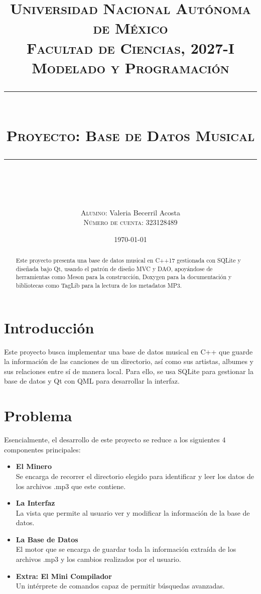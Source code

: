 \documentclass[12pt]{article}  %
\title{
    \textsc{\Large Universidad Nacional Autónoma de México\\[0.2cm]
        {\normalsize Facultad de Ciencias, 2027-I}\\[0.2cm]
        {\normalsize Modelado y Programación}}\\[0.6cm]
    \rule{\linewidth}{0.4pt}\\[0.4cm]
    {\textsc{\Large {\color{maincolor}Proyecto:} Base de Datos Musical}}\\[0.1cm]
    \rule{\linewidth}{0.4pt}\\[1em]
}
\author{
    \textsc{Alumno:} Valeria Becerril Acosta\\[0.2cm]
    \textsc{Número de cuenta:} 323128489\\[0.4cm]
}
\date{\today\\[2.6cm]}
\begin{document}
\maketitle
\thispagestyle{empty}

\begin{abstract}
    Este proyecto presenta una base de datos musical en C++17 gestionada con
    SQLite y diseñada bajo Qt, usando el patrón de diseño MVC y DAO, apoyándose de
    herramientas como Meson para la construcción, Doxygen para la documentación y
    bibliotecas como TagLib para la lectura de los metadatos MP3.
\end{abstract}

\newpage
\tableofcontents

\newpage
\section{Introducción}

Este proyecto busca implementar una base de datos musical en C++ que guarde la
información de las canciones de un directorio, así como sus artistas, albumes y
sus relaciones entre sí de manera local. Para ello, se usa SQLite para gestionar
la base de datos y Qt con QML para desarrollar la interfaz.

\section{Problema}

Esencialmente, el desarrollo de este proyecto se reduce a los siguientes 4
componentes principales:

\begin{itemize}
  \item {\color{maincolor}\textbf{El Minero}}\\
    Se encarga de recorrer el directorio elegido para identificar y leer los
    datos de los archivos .mp3 que este contiene.
  \item {\color{maincolor}\textbf{La Interfaz}}\\
    La vista que permite al usuario ver y modificar la información de la base de
    datos.
  \item {\color{maincolor}\textbf{La Base de Datos}}\\
    El motor que se encarga de guardar toda la información extraída de los
    archivos .mp3 y los cambios realizados por el usuario.
  \item {\color{maincolor}\textbf{Extra: El Mini Compilador}}\\
    Un intérprete de comandos capaz de permitir búsquedas avanzadas.
\end{itemize}
\end{document}
